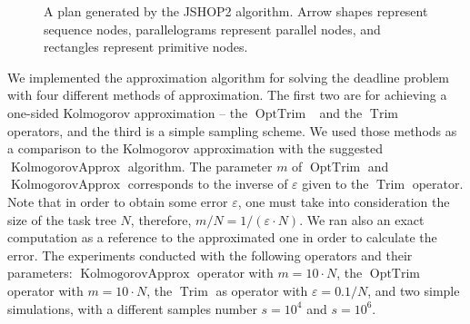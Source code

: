 \documentclass{article}
\DeclareMathOperator{\Trim}{Trim}
\DeclareMathOperator{\KlmApprox}{KolmogorovApprox}
\DeclareMathOperator{\OptTrim}{OptTrim}
\begin{document}
\begin{figure}[htb]
{
	}
	
	\caption{A plan generated by the JSHOP2 algorithm. Arrow shapes represent sequence
		nodes, parallelograms represent parallel nodes, and rectangles represent primitive nodes.}
	\label{fig:logistics}
	
\end{figure}  

We implemented the approximation algorithm for solving the deadline problem with four different methods of approximation. The first two are for achieving a one-sided Kolmogorov approximation -- the $\OptTrim$~\cite{CohenGW18} and the $\Trim$~\cite{cohen2015estimating} operators, and the third is a simple sampling scheme. We used those methods as a comparison to the Kolmogorov approximation with the suggested $\KlmApprox$ algorithm. 
The parameter $m$ of $\OptTrim$ and $\KlmApprox$ corresponds to the inverse of $\varepsilon$ given to the $\Trim$ operator. Note that in order to obtain some error $\varepsilon$, one must take into consideration the size of the task tree $N$, therefore, $m/N=1/(\varepsilon\cdot N)$. We ran also an exact computation as a reference to the approximated one in order to calculate the error. The experiments conducted with the following operators and their parameters: $\KlmApprox$ operator with $m=10\cdot N$, the $\OptTrim$ operator with $m=10\cdot N$, the $\Trim$ as operator with $\varepsilon={0.1/N}$, and two simple simulations, with a different samples number $s=10^4$ and $s=10^6$. 
\end{document}
